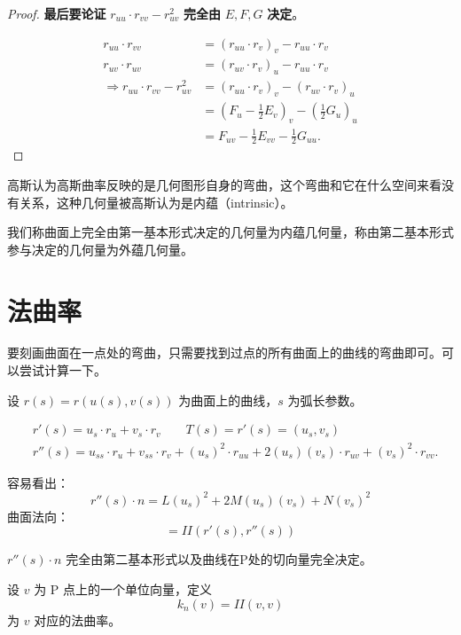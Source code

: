\documentclass[lang=cn,10pt,thmcnt=section]{elegantbook}
\begin{document}
\begin{proof}
        \textbf{最后要论证} $r_{uu} \cdot r_{vv} - r_{uv}^2$ \textbf{完全由} $E, F, G$ \textbf{决定}。
        
        \begin{align*}
        r_{uu} \cdot r_{vv} &= (r_{uu} \cdot r_{v})_v - r_{uu} \cdot r_{v} \\
        r_{uv} \cdot r_{uv} &= (r_{uv} \cdot r_{v})_u - r_{uu} \cdot r_{v} \\
        \Rightarrow r_{uu} \cdot r_{vv} - r_{uv}^2 &= (r_{uu} \cdot r_{v})_v - (r_{uv} \cdot r_{v})_u \\
        &= (F_u - \frac{1}{2} E_v)_v - (\frac{1}{2} G_u)_u \\
        &= F_{uv} - \frac{1}{2} E_{vv} - \frac{1}{2} G_{uu}.
        \end{align*}
\end{proof}

高斯认为高斯曲率反映的是几何图形自身的弯曲，这个弯曲和它在什么空间来看没有关系，这种几何量被高斯认为是内蕴（intrinsic）。
\begin{definition}
    我们称曲面上完全由第一基本形式决定的几何量为内蕴几何量，称由第二基本形式参与决定的几何量为外蕴几何量。
\end{definition}

\section{法曲率}

要刻画曲面在一点处的弯曲，只需要找到过点的所有曲面上的曲线的弯曲即可。可以尝试计算一下。

设 $r(s) = r(u(s), v(s))$ 为曲面上的曲线，$s$ 为弧长参数。


\begin{equation*}
    \begin{aligned}
    &r'(s) = u_s \cdot r_u + v_s \cdot r_v \qquad T(s) = r'(s) = (u_s, v_s) \\
    &r''(s) = u_{ss} \cdot r_u + v_{ss} \cdot r_v  + (u_s)^2 \cdot r_{uu} + 2(u_s)(v_s) \cdot r_{uv} + (v_s)^2 \cdot r_{vv}.
    \end{aligned}
    \end{equation*}
    
    容易看出：
    \begin{equation*}
    r''(s) \cdot n = L(u_s)^2 + 2M(u_s)(v_s) + N(v_s)^2
    \end{equation*}
    曲面法向：
    \begin{equation*}
    = II (r'(s), r''(s))
    \end{equation*}
    \begin{proposition}
        $r''(s) \cdot n$ 完全由第二基本形式以及曲线在P处的切向量完全决定。
    \end{proposition}
\begin{definition}[法曲率]
    设 $v$ 为 P 点上的一个单位向量，定义
\[ k_n(v) = II(v,v) \]
为 $v$ 对应的法曲率。
\end{definition}
\end{document}
